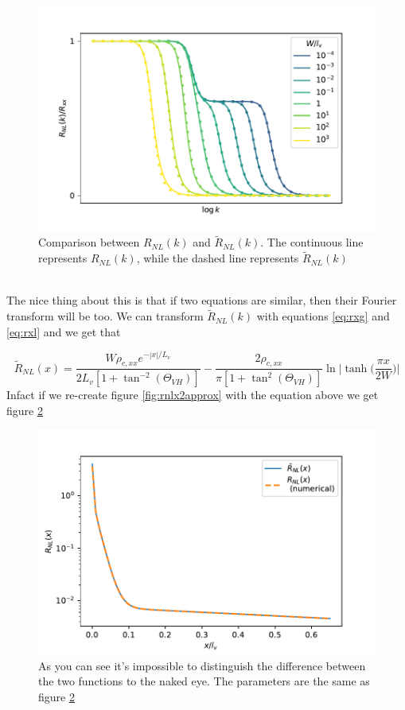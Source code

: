\begin{figure}[h!]
    \centering
    \includegraphics[width=\linewidth]{Immagini/rnl/kapproxcomp.pdf}
    \caption{Comparison between $R_{NL}(k)$ and $\tilde R_{NL}(k)$. The continuous line represents $R_{NL}(k)$, while the dashed line represents $\tilde R_{NL}(k)$}
    \label{fig:kapproxcomp}
\end{figure}\\
The nice thing about this is that if two equations are similar, then their Fourier transform will be too. We can transform $\tilde R_{NL}(k)$ with equations \ref{eq:rxg} and \ref{eq:rxl} and we get that

\begin{equation}
    \boxed{
        \tilde R_{NL}(x)=
        \frac{W \rho_{c,xx}e^{-|x|/L_v}}{2L_v[1+\tan^{-2}(\Theta_{VH})]}-
        \frac{2\rho_{c,xx}}{\pi [1+\tan^2(\Theta_{VH})]}\ln \bigg|\tanh \Big(\frac{\pi x}{2W}\Big)\bigg|
    }
\end{equation}
Infact if we re-create figure \ref{fig:rnlx2approx} with the equation above we get figure \ref{fig:rnlxapprox}

\begin{figure}[h!]
    \centering
    \includegraphics[width=\linewidth]{Immagini/rnl/xapprox.pdf}
    \caption{As you can see it's impossible to distinguish the difference between the two functions to the naked eye. The parameters are the same as figure \ref{fig:rnlxapprox}}
    \label{fig:rnlxapprox}
\end{figure}